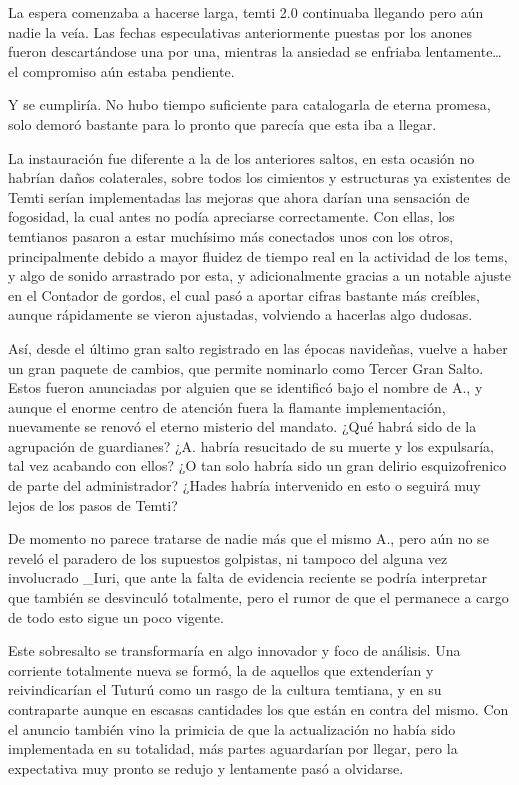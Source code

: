 \documentclass[
  spanish,
]{book}
\begin{document}
La espera comenzaba a hacerse larga, temti 2.0 continuaba llegando pero aún nadie la veía. Las fechas especulativas anteriormente puestas por los anones fueron descartándose una por una, mientras la ansiedad se enfriaba lentamente\ldots{} el compromiso aún estaba pendiente.

Y se cumpliría. No hubo tiempo suficiente para catalogarla de eterna promesa, solo demoró bastante para lo pronto que parecía que esta iba a llegar.

La instauración fue diferente a la de los anteriores saltos, en esta ocasión no habrían daños colaterales, sobre todos los cimientos y estructuras ya existentes de Temti serían implementadas las mejoras que ahora darían una sensación de fogosidad, la cual antes no podía apreciarse correctamente. Con ellas, los temtianos pasaron a estar muchísimo más conectados unos con los otros, principalmente debido a mayor fluidez de tiempo real en la actividad de los tems, y algo de sonido arrastrado por esta, y adicionalmente gracias a un notable ajuste en el Contador de gordos, el cual pasó a aportar cifras bastante más creíbles, aunque rápidamente se vieron ajustadas, volviendo a hacerlas algo dudosas.

Así, desde el último gran salto registrado en las épocas navideñas, vuelve a haber un gran paquete de cambios, que permite nominarlo como Tercer Gran Salto. Estos fueron anunciadas por alguien que se identificó bajo el nombre de A., y aunque el enorme centro de atención fuera la flamante implementación, nuevamente se renovó el eterno misterio del mandato. ¿Qué habrá sido de la agrupación de guardianes? ¿A. habría resucitado de su muerte y los expulsaría, tal vez acabando con ellos? ¿O tan solo habría sido un gran delirio esquizofrenico de parte del administrador? ¿Hades habría intervenido en esto o seguirá muy lejos de los pasos de Temti?

De momento no parece tratarse de nadie más que el mismo A., pero aún no se reveló el paradero de los supuestos golpistas, ni tampoco del alguna vez involucrado \_Iuri, que ante la falta de evidencia reciente se podría interpretar que también se desvinculó totalmente, pero el rumor de que el permanece a cargo de todo esto sigue un poco vigente.

Este sobresalto se transformaría en algo innovador y foco de análisis. Una corriente totalmente nueva se formó, la de aquellos que extenderían y reivindicarían el Tuturú como un rasgo de la cultura temtiana, y en su contraparte aunque en escasas cantidades los que están en contra del mismo. Con el anuncio también vino la primicia de que la actualización no había sido implementada en su totalidad, más partes aguardarían por llegar, pero la expectativa muy pronto se redujo y lentamente pasó a olvidarse.
\end{document}
